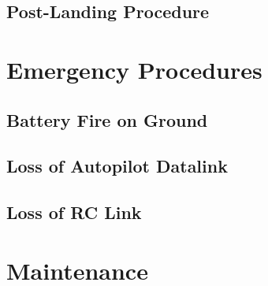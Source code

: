 \documentclass{report}
\begin{document}
	\section{Post-Landing Procedure}
\chapter{Emergency Procedures}
	\section{Battery Fire on Ground}
	\section{Loss of Autopilot Datalink}
	\section{Loss of RC Link}
\chapter{Maintenance}
\end{document}
